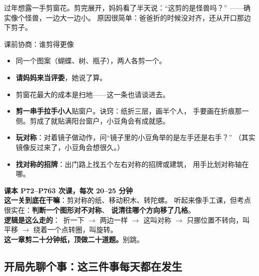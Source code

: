 
\begin{blunder}
过年想露一手剪窗花。剪完展开，妈妈看了半天说：“这剪的是怪兽吗？”
——确实像个怪兽，一边大一边小。
原因很简单：爸爸折的时候没对齐，还从开口那边下剪子。
\end{blunder}

\begin{gamble}{课前协商：谁剪得更像}
\begin{itemize}
  \item 同一个图案（蝴蝶、树、瓶子），两人各剪一个。
  \item \textbf{请妈妈来当评委}，她说了算。
  \item 剪窗花最大的成本是扫地——这一条也请谈进去。
\end{itemize}
\negolines
\end{gamble}

\begin{bonus}
\begin{itemize}
  \item \textbf{剪一串手拉手小人}贴窗户。诀窍：纸折三层，画半个人，
        手要画在折痕那一侧。剪成了就贴满阳台窗户，小豆角会有成就感。
  \item \textbf{玩对称}：对着镜子做动作，问“镜子里的小豆角举的是左手还是右手？”
        （其实镜像反过来了，小豆角会想很久。）
  \item \textbf{找对称的招牌}：出门路上找五个左右对称的招牌或建筑，
        用手比划对称轴在哪。
\end{itemize}
\end{bonus}

\begin{unitinfo}
\textbf{课本 P72--P76}\quad \textbf{3 次课，每次 20--25 分钟} \\[4pt]
\textbf{这一关到底在干嘛}：剪对称的纸、移动积木、转陀螺。
听起来像手工课，但考点很实在：\textbf{判断一个图形对不对称}、
\textbf{说清往哪个方向移了几格}。\\
\textbf{逻辑是这么走的}：\ 折一下 $\to$ 两边一样 $\to$ 这叫对称
$\to$ 只挪位置不转向，叫平移 $\to$ 绕着一个点转圈，叫旋转。\\
\textbf{这一章剪二十分钟纸，顶做二十道题。}别跳。
\end{unitinfo}

\subsection{开局先聊个事：这三件事每天都在发生}

